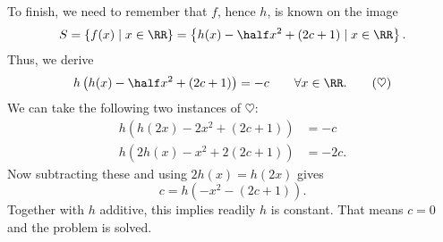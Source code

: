 To finish, we need to remember that $f$, hence $h$, is known
on the image
\[ S =  \left\{ f(x) \mid x \in \RR \right\}
  = \left\{ h(x) - \half x^2 + (2c+1) \mid x \in \RR \right\}. \]
Thus, we derive
\[ h\left( h(x)-\half x^2+(2c+1) \right) = -c
  \qquad \forall x \in \RR. \qquad(\heartsuit)  \]
We can take the following two instances of $\heartsuit$:
\begin{align*}
  h\left( h(2x)-2x^2+(2c+1) \right) &= -c \\
  h\left( 2h(x)-x^2+2(2c+1) \right) &= -2c.
\end{align*}
Now subtracting these and using $2h(x)=h(2x)$ gives
\[ c = h\left( -x^2 - (2c+1) \right). \]
Together with $h$ additive, this implies readily $h$ is constant.
That means $c=0$ and the problem is solved.
\pagebreak



